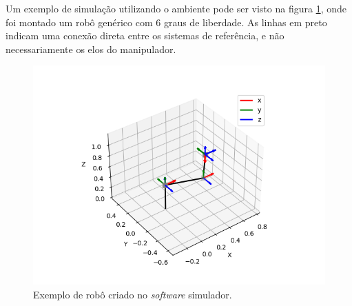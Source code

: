 Um exemplo de simulação utilizando o ambiente pode ser visto na figura \ref{fig:exemplo}, onde foi montado 
um robô genérico com 6 graus de liberdade. As linhas em preto indicam uma conexão direta entre os sistemas 
de referência, e não necessariamente os elos do manipulador.

\begin{figure}[h]
    \caption{Exemplo de robô criado no \textit{software} simulador.}

    \begin{centering}
        \includegraphics[width=0.7\columnwidth]{images/controle/simu-puma.png} 
    \par\end{centering}

    \label{fig:exemplo}
\end{figure}